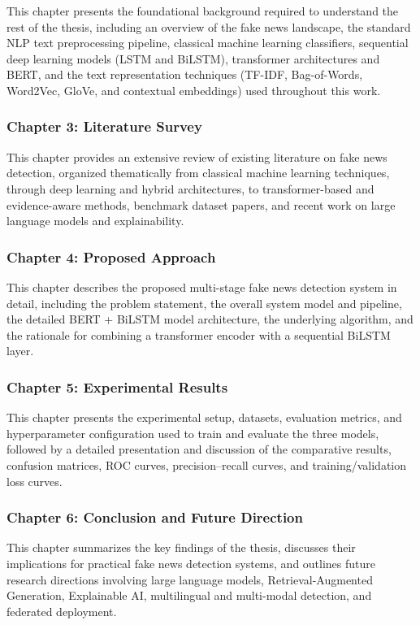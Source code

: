 This chapter presents the foundational background required to understand the rest of the thesis, including an overview of the fake news landscape, the standard NLP text preprocessing pipeline, classical machine learning classifiers, sequential deep learning models (LSTM and BiLSTM), transformer architectures and BERT, and the text representation techniques (TF-IDF, Bag-of-Words, Word2Vec, GloVe, and contextual embeddings) used throughout this work.

\subsubsection*{Chapter 3: Literature Survey}

This chapter provides an extensive review of existing literature on fake news detection, organized thematically from classical machine learning techniques, through deep learning and hybrid architectures, to transformer-based and evidence-aware methods, benchmark dataset papers, and recent work on large language models and explainability.

\subsubsection*{Chapter 4: Proposed Approach}

This chapter describes the proposed multi-stage fake news detection system in detail, including the problem statement, the overall system model and pipeline, the detailed BERT + BiLSTM model architecture, the underlying algorithm, and the rationale for combining a transformer encoder with a sequential BiLSTM layer.

\subsubsection*{Chapter 5: Experimental Results}

This chapter presents the experimental setup, datasets, evaluation metrics, and hyperparameter configuration used to train and evaluate the three models, followed by a detailed presentation and discussion of the comparative results, confusion matrices, ROC curves, precision--recall curves, and training/validation loss curves.

\subsubsection*{Chapter 6: Conclusion and Future Direction}

This chapter summarizes the key findings of the thesis, discusses their implications for practical fake news detection systems, and outlines future research directions involving large language models, Retrieval-Augmented Generation, Explainable AI, multilingual and multi-modal detection, and federated deployment.
